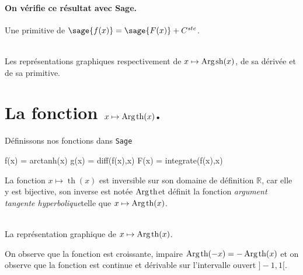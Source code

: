 \documentclass[a4paper,12pt]{report}
\def\eclaire{\mathbb}
\def\R{\ensuremath{\eclaire R}}
\renewcommand{\sinh}{\mathop{\mathrm{sh}}}
\renewcommand{\tanh}{\mathop{\mathrm{th}}}
\renewcommand{\arg}{\mathop{\mathrm{Arg}}}
\begin{document}
\paragraph{On vérifie ce résultat avec Sage.}
Une primitive de $\sage{f(x)} = \sage{F(x)} + C^{ste} $.

\begin{center}
\\
Les représentations graphiques respectivement de $x \mapsto \arg\mspace{-1mu}\sinh(x)$, de sa dérivée et de sa primitive.
\end{center}

\section{La fonction  $x \mapsto \arg\mspace{-1mu}\tanh(x)$.}
Définissons nos fonctions dans {\texttt{Sage}}
\begin{sageblock}
    f(x) = arctanh(x)
    g(x) = diff(f(x),x)
    F(x) = integrate(f(x),x)
\end{sageblock}

La fonction $x \mapsto \tanh(x)$ est inversible sur son domaine de définition $\R$, car elle y est bijective, son inverse est notée \og$ \arg\mspace{-1mu}\tanh $\fg et définit la fonction \og\emph{argument tangente hyperbolique}\fg telle que $x \mapsto \arg\mspace{-1mu}\tanh(x)$.


\begin{center}
 \\
La représentation graphique de $x \mapsto \arg\mspace{-1mu}\tanh(x)$.
\end{center}
On observe que la fonction est croissante, impaire $\arg\mspace{-1mu}\tanh(-x) = -\arg\mspace{-1mu}\tanh(x) $
et on observe que la fonction est continue et dérivable sur l'intervalle ouvert $]-1,1[$.                                                                                                             
\end{document}
